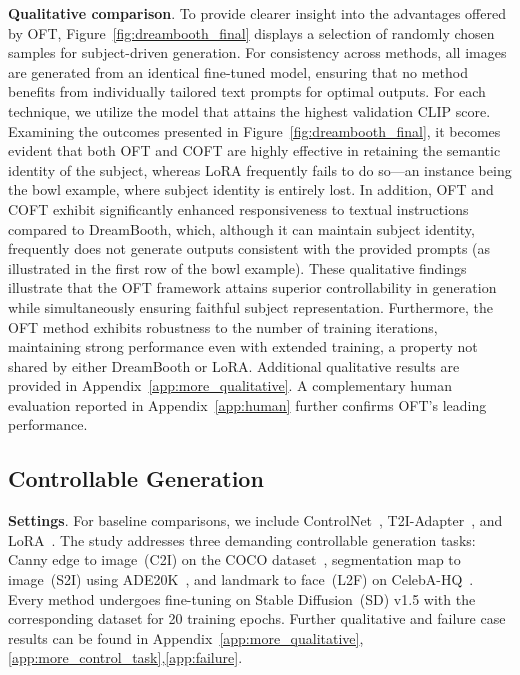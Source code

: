 {\textbf{Qualitative comparison}. To provide clearer insight into the advantages offered by OFT, Figure~\ref{fig:dreambooth_final} displays a selection of randomly chosen samples for subject-driven generation. For consistency across methods, all images are generated from an identical fine-tuned model, ensuring that no method benefits from individually tailored text prompts for optimal outputs. For each technique, we utilize the model that attains the highest validation CLIP score. Examining the outcomes presented in Figure~\ref{fig:dreambooth_final}, it becomes evident that both OFT and COFT are highly effective in retaining the semantic identity of the subject, whereas LoRA frequently fails to do so—an instance being the bowl example, where subject identity is entirely lost. In addition, OFT and COFT exhibit significantly enhanced responsiveness to textual instructions compared to DreamBooth, which, although it can maintain subject identity, frequently does not generate outputs consistent with the provided prompts (as illustrated in the first row of the bowl example). These qualitative findings illustrate that the OFT framework attains superior controllability in generation while simultaneously ensuring faithful subject representation. Furthermore, the OFT method exhibits robustness to the number of training iterations, maintaining strong performance even with extended training, a property not shared by either DreamBooth or LoRA. Additional qualitative results are provided in Appendix~\ref{app:more_qualitative}. A complementary human evaluation reported in Appendix~\ref{app:human} further confirms OFT's leading performance.

\subsection{Controllable Generation}

\textbf{Settings}. For baseline comparisons, we include ControlNet~\cite{zhang2023adding}, T2I-Adapter~\cite{mou2023t2i}, and LoRA~\cite{hulora2022}. The study addresses three demanding controllable generation tasks: Canny edge to image~(C2I) on the COCO dataset~\cite{lin2014microsoft}, segmentation map to image~(S2I) using ADE20K~\cite{zhou2017scene}, and landmark to face~(L2F) on CelebA-HQ~\cite{karras2018progressive,xia2021tedigan}. Every method undergoes fine-tuning on Stable Diffusion~(SD) v1.5 with the corresponding dataset for 20 training epochs. Further qualitative and failure case results can be found in Appendix~\ref{app:more_qualitative},\ref{app:more_control_task},\ref{app:failure}.

}
